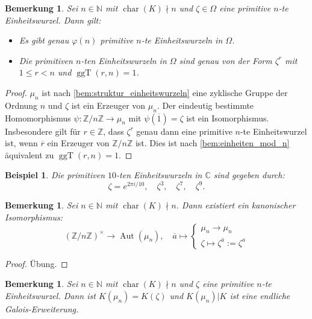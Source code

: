 \documentclass[a4paper, twoside, 11pt, ngerman]{report}
\newcommand{\CC}{\mathds C}
\newcommand{\NN}{\mathds N}
\newcommand{\ZZ}{\mathds Z}
\DeclareMathOperator{\charact}{char}
\DeclareMathOperator{\ggT}{ggT}
\theoremstyle{definistyle}
\newtheorem{bem}[satz]{Bemerkung}
\newtheorem{bsp}[satz]{Beispiel}
\theoremstyle{remark}
\begin{document}
\begin{bem}\label{bem:primitive_nte_EW}
Sei $n \in \NN$ mit $\charact(K)\nmid n$ und $\zeta \in \Omega$ eine primitive $n$-te Einheitswurzel. Dann gilt:
\begin{itemize}
    \item[(a)] Es gibt genau $\varphi(n)$ primitive $n$-te Einheitswurzeln in $\Omega$.
    \item[(b)] Die primitiven $n$-ten Einheitswurzeln in $\Omega$ sind genau von der Form $\zeta^r$ mit $1 \leq r < n$ und $\ggT(r, n) = 1$.
\end{itemize}
\end{bem}
\begin{proof}
$\mu_n$ ist nach \ref{bem:struktur_einheitswurzeln} eine zyklische Gruppe der Ordnung $n$
und $\zeta$ ist ein Erzeuger von $\mu_n$. Der eindeutig bestimmte Homomorphismus $\psi\colon \ZZ / n \ZZ \to \mu_n$  mit $\psi(\overline{1}) = \zeta$ ist ein Isomorphismus. Insbesondere gilt für $r \in \ZZ$, dass $\zeta^r$ genau dann eine primitive $n$-te Einheitswurzel ist, wenn $\overline{r}$ ein Erzeuger von $\ZZ / n \ZZ$ ist. Dies ist nach \ref{bem:einheiten_mod_n} äquivalent zu $ \ggT(r, n) = 1$.
\end{proof}

\begin{bsp}\label{bsp:10te_ew}
Die primitiven $10$-ten Einheitswurzeln in $\CC$ sind gegeben durch:
\[
\zeta = e^{2\pi i / 10}, \quad \zeta^3, \quad \zeta^7, \quad \zeta^9.
\]
\end{bsp}

\begin{bem}\label{bem:automorphismen_von_mu_n}
Sei $n \in \NN$ mit $\charact(K)\nmid n$. Dann existiert ein kanonischer Isomorphismus:
\[
(\ZZ / n \ZZ)^\times \to \operatorname{Aut}(\mu_n), \quad \overline{a} \mapsto 
\begin{cases}
\mu_n \to \mu_n \\
\zeta \mapsto \zeta^{\overline{a}}:=\zeta^a
\end{cases}
\]
\end{bem}

\begin{proof}
Übung.
\end{proof}

\begin{bem}\label{bem:einheitswurzel_erw_gal}
Sei $n \in \NN$ mit $\charact(K) \nmid n$ und $\zeta$ eine primitive $n$-te Einheitswurzel. Dann ist $K(\mu_n) = K(\zeta)$ und $K(\mu_n)|K$ ist eine endliche Galois-Erweiterung.
\end{bem}
\end{document}
